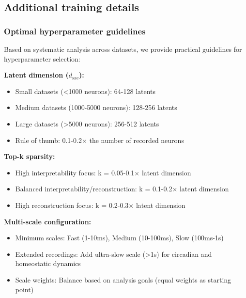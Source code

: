 \subsection{Additional training details}

\subsubsection{Optimal hyperparameter guidelines}

Based on systematic analysis across datasets, we provide practical guidelines for hyperparameter selection:

\textbf{Latent dimension ($d_{\text{sae}}$):}
\begin{itemize}
\item Small datasets (<1000 neurons): 64-128 latents
\item Medium datasets (1000-5000 neurons): 128-256 latents  
\item Large datasets (>5000 neurons): 256-512 latents
\item Rule of thumb: 0.1-0.2× the number of recorded neurons
\end{itemize}

\textbf{Top-k sparsity:}
\begin{itemize}
\item High interpretability focus: k = 0.05-0.1× latent dimension
\item Balanced interpretability/reconstruction: k = 0.1-0.2× latent dimension
\item High reconstruction focus: k = 0.2-0.3× latent dimension
\end{itemize}

\textbf{Multi-scale configuration:}
\begin{itemize}
\item Minimum scales: Fast (1-10ms), Medium (10-100ms), Slow (100ms-1s)
\item Extended recordings: Add ultra-slow scale (>1s) for circadian and homeostatic dynamics
\item Scale weights: Balance based on analysis goals (equal weights as starting point)
\end{itemize}
